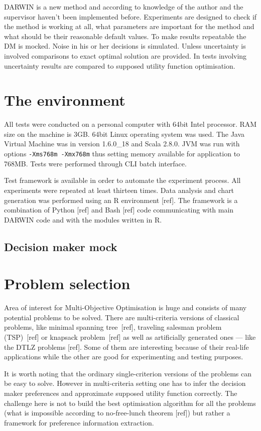 DARWIN is a new method and according to knowledge of the author and the
supervisor haven't been implemented before. Experiments are
designed to check if the method is working at all, what parameters are important
for the method and what should be their reasonable default values. To make
results repeatable the DM is mocked. Noise in his or her decisions is
simulated. Unless uncertainty is involved comparisons to exact optimal
solution are provided. In tests involving uncertainty results are compared to
supposed utility function optimisation. 

\section{The environment}

All tests were conducted on a personal computer with 64bit Intel
processor. RAM size on the machine is 3GB. 64bit Linux operating system was
used. The Java Virtual Machine was in version 1.6.0\_18 and Scala 2.8.0. JVM
was run with options \texttt{-Xms768m -Xmx768m} thus setting memory available
for application to 768MB. Tests were performed through CLI batch interface.

Test framework is available in order to automate the experiment process. All
experiments were repeated at least thirteen times. Data analysis and chart
generation was performed using an R environment [ref]. The framework is a
combination of Python [ref] and Bash [ref] code communicating with main DARWIN
code and with the modules written in R.

\subsection{Decision maker mock}


\section{Problem selection}

Area of interest for Multi-Objective Optimisation is huge and consists of many
potential problems to be solved. There are multi-criteria versions of
classical problems, like minimal spanning tree~[ref], traveling salesman
problem (TSP)~[ref] or knapsack problem~[ref] as well as artificially
generated ones --- like the DTLZ problems [ref]. Some of them are interesting
because of their real-life applications while the other are good for
experimenting and testing purposes.

It is worth noting that the ordinary single-criterion versions of the problems
can be easy to solve. However in multi-criteria setting one has to infer the
decision maker preferences and approximate supposed utility function
correctly. The challenge here is not to build the best optimisation algorithm
for all the problems (what is impossible according to no-free-lunch theorem
[ref]) but rather a framework for preference information extraction.

